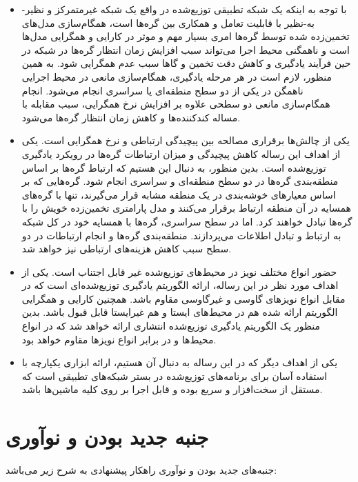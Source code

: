 \begin{itemize}
	\item 
	با توجه به اینکه یک شبکه تطبیقی توزیع‌شده در واقع یک شبکه غیرمتمرکز و نظیر-به-نظیر با قابلیت تعامل و همکاری بین گره‌ها است، همگام‌سازی مدل‌های تخمین‌زده شده توسط گره‌ها امری بسیار مهم و موثر در کارایی و همگرایی مدل‌ها است و ناهمگنی محیط اجرا می‌تواند سبب افزایش زمان انتظار گره‌ها در شبکه در حین فرآیند یادگیری و کاهش دقت تخمین و گاها سبب عدم همگرایی شود. به همین منظور، لازم است در هر مرحله یادگیری، همگام‌سازی مانعی در محیط اجرایی ناهمگن در یکی از دو سطح منطقه‌ای یا سراسری انجام می‌شود. انجام همگام‌سازی مانعی دو سطحی علاوه بر افزایش نرخ همگرایی، سبب مقابله با مساله کندکننده‌ها و کاهش زمان انتظار گره‌ها می‌شود. 
	\item 
	یکی از چالش‌ها برقراری مصالحه بین پیچیدگی ارتباطی و نرخ همگرایی است. یکی از اهداف این رساله کاهش پیچیدگی و میزان ارتباطات گره‌ها در رویکرد یادگیری توزیع‌شده است. بدین منظور، به دنبال این هستیم که ارتباط گره‌ها بر اساس منطقه‌بندی گره‌ها در دو سطح منطقه‌ای و سراسری انجام شود. گره‌هایی که بر اساس معیارهای خوشه‌بندی در یک منطقه مشابه قرار می‌گیرند، تنها با گره‌های همسایه در آن منطقه ارتباط برقرار می‌کنند و مدل‌ پارامتری تخمین‌زده خویش را با گره‌ها تبادل خواهند کرد. اما در سطح سراسری، گره‌ها با همسایه خود در کل شبکه به ارتباط و تبادل اطلاعات می‌پردازند. منطقه‌بندی گره‌ها و انجام ارتباطات در دو سطح سبب کاهش هزینه‌های ارتباطی نیز خواهد شد. 
	\item 
	حضور انواع مختلف نویز در محیط‌های توزیع‌شده غیر قابل اجتناب است. یکی از اهداف مورد نظر در این رساله، ارائه الگوریتم یادگیری توزیع‌شده‌ای است که در مقابل انواع نویزهای گاوسی و غیرگاوسی مقاوم باشد. همچنین کارایی و همگرایی الگوریتم ارائه شده هم در محیط‌های ایستا و هم غیرایستا قابل قبول باشد. بدین منظور یک الگوریتم یادگیری توزیع‌شده انتشاری ارائه خواهد شد که در انواع محیط‌ها و در برابر انواع نویزها مقاوم خواهد بود. 
	\item 
	یکی از اهداف دیگر که در این رساله به دنبال آن هستیم، ارائه ابزاری یکپارچه با استفاده آسان برای برنامه‌های توزیع‌شده در بستر شبکه‌های تطبیقی است که مستقل از سخت‌افزار و سریع بوده و قابل اجرا بر روی کلیه ماشین‌ها باشد. 
	
\end{itemize}


\section{جنبه جدید بودن و نوآوری}

جنبه‌های جدید بودن و نوآوری راهکار پیشنهادی به شرح زیر می‌باشد:


